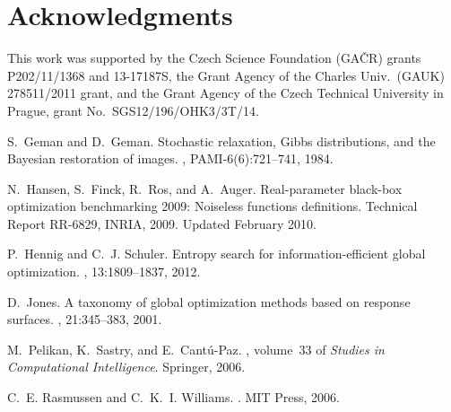 \documentclass{sig-alt-release2}
\begin{document}


\section{Acknowledgments}

This work was supported by 
the Czech Science Foundation (GA\v{C}R) grants \hbox{P202/11/1368} and \hbox{13-17187S},
the Grant Agency of the Charles Univ.\ (GAUK) \hbox{278511/2011} grant, 
and
the Grant Agency of the Czech Technical University in Prague, grant No.~\hbox{SGS12/196/OHK3/3T/14}.

%

\begin{thebibliography}{1}

S.~Geman and D.~Geman.
\newblock Stochastic relaxation, {G}ibbs distributions, and the {B}ayesian
  restoration of images.
,
  PAMI-6(6):721--741, 1984.

N.~Hansen, S.~Finck, R.~Ros, and A.~Auger.
\newblock Real-parameter black-box optimization benchmarking 2009: Noiseless
  functions definitions.
\newblock Technical Report RR-6829, INRIA, 2009.
\newblock Updated February 2010.

P.~Hennig and C.~J. Schuler.
\newblock Entropy search for information-efficient global optimization.
, 13:1809--1837, 2012.

D.~Jones.
\newblock A taxonomy of global optimization methods based on response surfaces.
, 21:345--383, 2001.

M.~Pelikan, K.~Sastry, and E.~Cant\'{u}-Paz.
, volume~33 of
  {\em Studies in Computational Intelligence}.
\newblock Springer, 2006.

C.~E. Rasmussen and C.~K.~I. Williams.
.
\newblock MIT Press, 2006.

\end{thebibliography}
%
%
\end{document}
